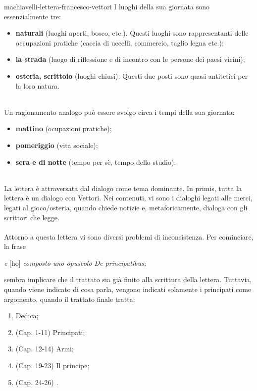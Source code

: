 \documentclass[preview]{standalone}
\begin{document}
\begin{snippet}{machiavelli-lettera-francesco-vettori}
    I luoghi della sua giornata sono essenzialmente tre:
    \begin{itemize}
        \item \textbf{naturali} (luoghi aperti, bosco, etc.).
            Questi luoghi sono rappresentanti delle occupazioni pratiche (caccia di uccelli, commercio, taglio legna etc.);
        \item \textbf{la strada} (luogo di riflessione e di incontro con le persone dei paesi vicini);
        \item \textbf{osteria, scrittoio} (luoghi chiusi). Questi due posti sono quasi antitetici per la loro natura.
    \end{itemize}
    \phantom{}\\
    Un ragionamento analogo può essere svolgo circa i tempi della sua giornata:
    \begin{itemize}
        \item \textbf{mattino} (ocupazioni pratiche);
        \item \textbf{pomeriggio} (vita sociale);
        \item \textbf{sera e di notte} (tempo per sè, tempo dello studio).
    \end{itemize}
    \phantom{}\\
    La lettera è attraversata dal dialogo come tema dominante.
    In primis, tutta la lettera è un dialogo con Vettori.
    Nei contenuti, vi sono i dialoghi legati alle merci, legati al gioco/osteria,
    quando chiede notizie e, metaforicamente, dialoga con gli scrittori che legge.
    \\\\
    Attorno a questa lettera vi sono diversi problemi di inconsistenza.
    Per cominciare, la frase
    \begin{center}
        \textit{e} [ho] \textit{composto uno opuscolo De principatibus;}
    \end{center}
    sembra implicare che il trattato sia già finito alla scrittura della lettera.
    Tuttavia, quando viene indicato di cosa parla, vengono indicati solamente
    i principati come argomento, quando il trattato finale
    tratta:
    \begin{enumerate}
        \item Dedica;
        \item (Cap. 1-11) Principati;
        \item (Cap. 12-14) Armi;
        \item (Cap. 19-23) Il principe;
        \item (Cap. 24-26) .

\end{enumerate}
\end{snippet}
\end{document}

